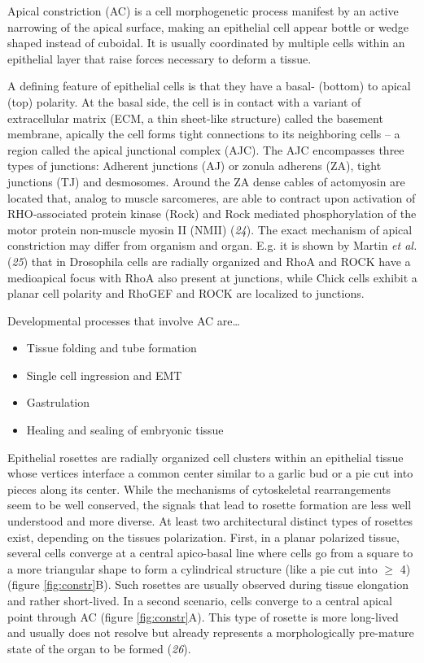 \documentclass[11pt,singlespacinge,twoside]{reedthesis} %
\providecommand{\tightlist}{%
  \setlength{\itemsep}{0pt}\setlength{\parskip}{0pt}}
\theoremstyle{definition}
\theoremstyle{definition}
\theoremstyle{definition}
\theoremstyle{remark}
\begin{document}
Apical constriction (AC) is a cell morphogenetic process manifest by an active narrowing of the apical surface, making an epithelial cell appear bottle or wedge shaped instead of cuboidal. It is usually coordinated by multiple cells within an epithelial layer that raise forces necessary to deform a tissue.

A defining feature of epithelial cells is that they have a basal- (bottom) to apical (top) polarity. At the basal side, the cell is in contact with a variant of extracellular matrix (ECM, a thin sheet-like structure) called the basement membrane, apically the cell forms tight connections to its neighboring cells -- a region called the apical junctional complex (AJC). The AJC encompasses three types of junctions: Adherent junctions (AJ) or zonula adherens (ZA), tight junctions (TJ) and desmosomes. Around the ZA dense cables of actomyosin are located that, analog to muscle sarcomeres, are able to contract upon activation of RHO‑associated protein kinase (Rock) and Rock mediated phosphorylation of the motor protein non-muscle myosin II (NMII) (\emph{24}). The exact mechanism of apical constriction may differ from organism and organ. E.g. it is shown by Martin \emph{et al.} (\emph{25}) that in Drosophila cells are radially organized and RhoA and ROCK have a medioapical focus with RhoA also present at junctions, while Chick cells exhibit a planar cell polarity and RhoGEF and ROCK are localized to junctions.

Developmental processes that involve AC are\ldots{}
\begin{itemize}
\tightlist
\item
  Tissue folding and tube formation
\item
  Single cell ingression and EMT
\item
  Gastrulation
\item
  Healing and sealing of embryonic tissue
\end{itemize}
Epithelial rosettes are radially organized cell clusters within an epithelial tissue whose vertices interface a common center similar to a garlic bud or a pie cut into pieces along its center. While the mechanisms of cytoskeletal rearrangements seem to be well conserved, the signals that lead to rosette formation are less well understood and more diverse.
At least two architectural distinct types of rosettes exist, depending on the tissues polarization.
First, in a planar polarized tissue, several cells converge at a central apico-basal line where cells go from a square to a more triangular shape to form a cylindrical structure (like a pie cut into \(\geq\) 4) (figure \ref{fig:constr}B). Such rosettes are usually observed during tissue elongation and rather short-lived. In a second scenario, cells converge to a central apical point through AC (figure \ref{fig:constr}A). This type of rosette is more long-lived and usually does not resolve but already represents a morphologically pre-mature state of the organ to be formed (\emph{26}).
\end{document}
